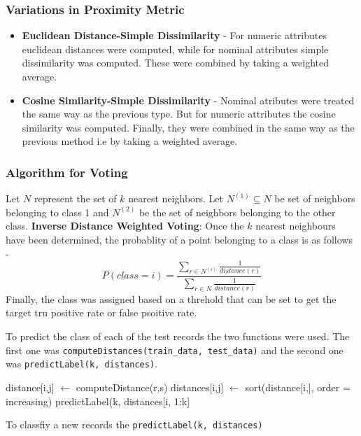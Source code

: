  \subsubsection{Variations in Proximity Metric}
 \begin{itemize}
 	\item \textbf{Euclidean Distance-Simple Dissimilarity} - For numeric attributes euclidean distances were computed, while for nominal attributes simple dissimilarity was computed. These were combined by taking a weighted average.
 	\item \textbf{Cosine Similarity-Simple Dissimilarity} - Nominal atributes were treated the same way as the previous type. But for numeric attributes the cosine similarity was computed. Finally, they were combined in the same way as the previous method i.e by taking a weighted average.
 \end{itemize}
\subsubsection{Algorithm for Voting}
 	 	Let $N$ represent the set of $k$ nearest neighbors. Let $N^(1)\subseteq N$ be set of neighbors belonging to class 1 and $N^(2)$ be the set of neighbors belonging to the other class.
\textbf{Inverse Distance Weighted Voting}: Once the $k$ nearest neighbours have been determined, the probablity of a point belonging to a class is as follows - 
\begin{equation*}
	P(class = i) = \frac{\sum_{r \in N^(i)} \frac{1}{distance(r)}}{\sum_{r \in N} \frac{1}{distance(r)}}
\end{equation*}
Finally, the class was assigned based on a threhold that can be set to get the target tru positive rate or false psoitive rate.

To predict the class of each of the test records the two functions were used. The first one was \texttt{computeDistances(train\_data, test\_data)} and the second one was \texttt{predictLabel(k, distances)}. 
\begin{algorithm}
	\begin{algorithmic}
			\State distance[i,j] $\gets$ computeDistance(r,s)
		\EndFor
		distances[i,j] $\gets$ sort(distance[i,], order = increasing)
		predictLabel(k, distances[i, 1:k]	
	\EndFor	
	\end{algorithmic}
\end{algorithm}
To classfiy a new records the \texttt{predictLabel(k, distances)}

